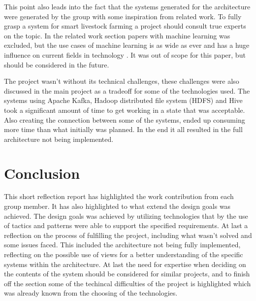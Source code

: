 \documentclass[conference]{IEEEtran}
\begin{document}
This point also leads into the fact that the systems generated for the architecture were generated by the group with some inspiration from related work. To fully grasp a system for smart livestock farming a project should consult true experts on the topic. In the related work section papers with machine learning was excluded, but the use cases of machine learning is as wide as ever and has a huge influence on current fields in technology \cite{Halder_2023}. It was out of scope for this paper, but should be considered in the future. \newline

The project wasn't without its technical challenges, these challenges were also discussed in the main project as a tradeoff for some of the technologies used. The systems using Apache Kafka, Hadoop distributed file system (HDFS) and Hive took a significant amount of time to get working in a state that was acceptable. Also creating the connection between some of the systems, ended up consuming more time than what initially was planned. In the end it all resulted in the full architecture not being implemented. \newline


\section{Conclusion}
This short reflection report has highlighted the work contribution from each group member. It has also highlighted to what extend the design goals was achieved. The design goals was achieved by utilizing technologies that by the use of tactics and patterns were able to support the specified requirements. At last a reflection on the process of fulfilling the project, including what wasn't solved and some issues faced. This included the architecture not being fully implemented, reflecting on the possible use of views for a better understanding of the specific systems within the architecture. At last the need for expertise when deciding on the contents of the system should be considered for similar projects, and to finish off the section some of the techincal difficulties of the project is highlighted which was already known from the choosing of the technologies.



\vspace{12pt}
\end{document}
